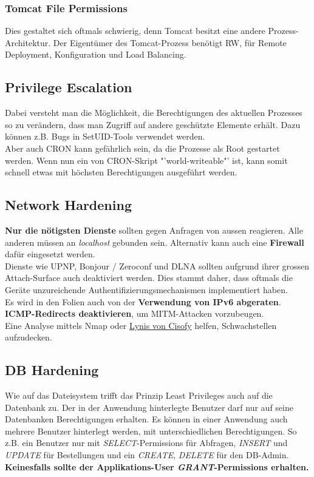 \subsubsection{Tomcat File Permissions}
Dies gestaltet sich oftmals schwierig, denn Tomcat besitzt eine andere Prozess-Architektur. Der Eigentümer des Tomcat-Prozess benötigt RW, für Remote Deployment, Konfiguration und Load Balancing.

\subsection{Privilege Escalation}
Dabei versteht man die Möglichkeit, die Berechtigungen des aktuellen Prozesses so zu verändern, dass man Zugriff auf andere geschützte Elemente erhält. Dazu können z.B. Bugs in SetUID-Tools verwendet werden.\\

Aber auch CRON kann gefährlich sein, da die Prozesse als Root gestartet werden. Wenn nun ein von CRON-Skript "'world-writeable"' ist, kann somit schnell etwas mit höchsten Berechtigungen ausgeführt werden.

\subsection{Network Hardening}
\textbf{Nur die nötigsten Dienste} sollten gegen Anfragen von aussen reagieren. Alle anderen müssen an \textit{localhost} gebunden sein. Alternativ kann auch eine \textbf{Firewall} dafür eingesetzt werden.\\
Dienste wie UPNP, Bonjour / Zeroconf und DLNA sollten aufgrund ihrer grossen Attach-Surface auch deaktiviert werden. Dies stammt daher, dass oftmals die Geräte unzureichende Authentifizierungsmechanismen implementiert haben.\\

Es wird in den Folien auch von der \textbf{Verwendung von IPv6 abgeraten}.\\

\textbf{ICMP-Redirects deaktivieren}, um MITM-Attacken vorzubeugen.\\

Eine Analyse mittels Nmap oder \href{https://cisofy.com/lynis/}{Lynis von Cisofy} helfen, Schwachstellen aufzudecken.

\subsection{DB Hardening}
Wie auf das Dateisystem trifft das Prinzip Least Privileges auch auf die Datenbank zu. Der in der Anwendung hinterlegte Benutzer darf nur auf seine Datenbanken Berechtigungen erhalten. Es können in einer Anwendung auch mehrere Benutzer hinterlegt werden, mit unterschiedlichen Berechtigungen. So z.B. ein Benutzer nur mit \textit{SELECT}-Permissions für Abfragen, \textit{INSERT} und \textit{UPDATE} für Bestellungen und ein \textit{CREATE}, \textit{DELETE} für den DB-Admin.\\
\textbf{Keinesfalls sollte der Applikations-User \textit{GRANT}-Permissions erhalten.}